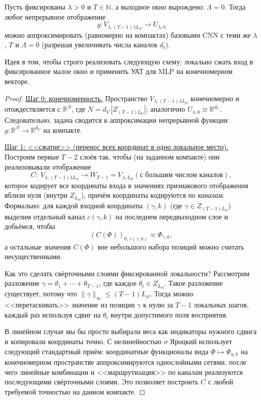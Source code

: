 \documentclass[../NDCNNAI_main.tex]{subfiles}
\begin{document}
\begin{lemma}
\label{lem:approx_degen_window}
Пусть фиксированы $\lambda>0$ и $T\in\mathbb{N}$, а выходное окно вырождено: $\Lambda=0$.
Тогда \emph{любое} непрерывное отображение
\[
g\colon V_{\lambda,(T-1)\lambda L_{\mathrm{rf}}}\to U_{\lambda,0}
\]
можно аппроксимировать (равномерно на компактах) базовыми CNN с теми же $\lambda$, $T$ и $\Lambda=0$
(разрешая увеличивать числа каналов $d_t$).
\end{lemma}
Идея в том, чтобы строго реализовать следующую схему: локально сжать вход в фиксированное малое окно и применить УАТ для MLP на конечномерном векторе.\\

\begin{proof}
\leavevmode
\underline{Шаг 0: конечномерность.}
Пространство $V_{\lambda,(T-1)\lambda L_{\mathrm{rf}}}$ конечномерно и отождествляется с $\mathbb{R}^N$,
где $N=d_V\,|Z_{(T-1)L_{\mathrm{rf}}}|$; аналогично $U_{\lambda,0}\cong\mathbb{R}^{d_U}$.
Следовательно, задача сводится к аппроксимации непрерывной функции $g\colon\mathbb{R}^N\to\mathbb{R}^{d_U}$
на компакте.

\underline{Шаг 1: <<сжатие>> (перенос всех координат в одно локальное место).}
Построим первые $T-2$ слоёв так, чтобы (на заданном компакте) они реализовывали отображение
\[
C\colon \ V_{\lambda,(T-1)\lambda L_{\mathrm{rf}}}\to W_{T-1}=V_{\lambda,L_{\mathrm{rf}}}(\text{с большим числом каналов}),
\]
которое кодирует все координаты входа в значениях признакового отображения вблизи нуля (внутри $Z_{L_{\mathrm{rf}}}$),
причём координаты кодируются \emph{по каналам}.
Формально: для каждой входной координаты $(\gamma,k)$ (где $\gamma\in Z_{(T-1)L_{\mathrm{rf}}}$)
выделим отдельный канал $c(\gamma,k)$ на последнем передвыходном слое и добьёмся, чтобы
\[
(C(\Phi))_{0,\,c(\gamma,k)}\approx \Phi_{\gamma,k},
\]
а остальные значения $C(\Phi)$ вне небольшого набора позиций можно считать несущественными.

Как это сделать свёрточными слоями фиксированной локальности?
Рассмотрим разложение $\gamma=\theta_1+\cdots+\theta_{T-1}$, где каждое $\theta_i\in Z_{L_{\mathrm{rf}}}$.
Такое разложение существует, потому что $\|\gamma\|_\infty\le (T-1)L_{\mathrm{rf}}$.
Тогда можно <<перетаскивать>> значение из позиции $\gamma$ к нулю за $T-1$ локальных шагов,
каждый раз используя сдвиг на $\theta_i$ внутри допустимого поля восприятия.

В линейном случае мы бы просто выбирали веса как индикаторы нужного сдвига и копировали координаты точно.
С нелинейностью $\sigma$ Яроцкий использует следующий стандартный приём:
координатные функционалы вида $\Phi\mapsto \Phi_{\eta,k}$ на конечномерном пространстве
аппроксимируются однослойными сетями, после чего линейные комбинации и <<маршрутизация>> по каналам
реализуются последующими свёрточными слоями. Это позволяет построить $C$ с любой требуемой точностью
на данном компакте.


\end{proof}
\end{document}

